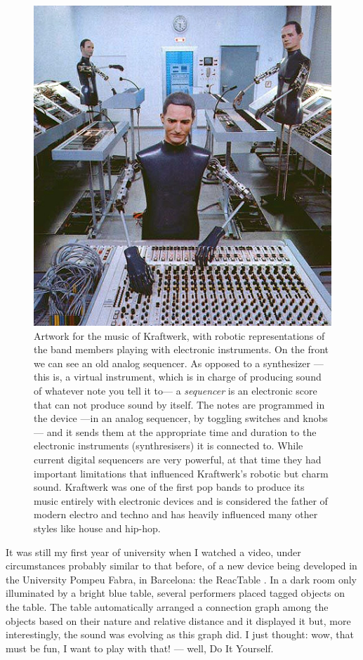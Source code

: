 \begin{figure}[h!]
  \centering
  \includegraphics[width=.6\textwidth]{pic/kraftwerk.jpg}
  \caption[Artwork for the music of Kraftwerk]{Artwork for the music
    of Kraftwerk, with robotic representations of the band members
    playing with electronic instruments. On the front we can see an
    old analog sequencer. As opposed to a synthesizer ---this is, a
    virtual instrument, which is in charge of producing sound of
    whatever note you tell it to--- a \emph{sequencer} is an
    electronic score that can not produce sound by itself. The notes
    are programmed in the device ---in an analog sequencer, by
    toggling switches and knobs--- and it sends them at the
    appropriate time and duration to the electronic instruments
    (synthresisers) it is connected to. While current digital
    sequencers are very powerful, at that time they had important
    limitations that influenced Kraftwerk's robotic but charm
    sound. Kraftwerk was one of the first pop bands to produce its
    music entirely with electronic devices and is considered the
    father of modern electro and techno and has heavily influenced
    many other styles like house and hip-hop.}
\end{figure}

It was still my first year of university when I watched a video, under
circumstances probably similar to that before, of a new device being
developed in the University Pompeu Fabra, in Barcelona: the ReacTable
\cite{jorda07thereactable}. In a dark room only illuminated by a
bright blue table, several performers placed tagged objects on the
table. The table automatically arranged a connection graph among the
objects based on their nature and relative distance and it displayed
it but, more interestingly, the sound was evolving as this graph
did. I just thought: wow, that must be fun, I want to play with that!
--- well, Do It Yourself.

